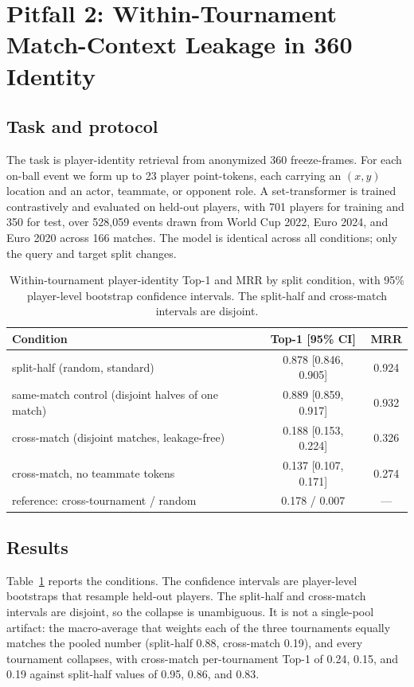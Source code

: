 \section{Pitfall 2: Within-Tournament Match-Context Leakage in 360 Identity}
\label{sec:p2}

\subsection{Task and protocol}
\label{sec:p2-task}

The task is player-identity retrieval from anonymized 360 freeze-frames. For
each on-ball event we form up to 23 player point-tokens, each carrying an
$(x, y)$ location and an actor, teammate, or opponent role. A set-transformer
is trained contrastively and evaluated on held-out players, with 701 players
for training and 350 for test, over 528{,}059 events drawn from World Cup 2022,
Euro 2024, and Euro 2020 across 166 matches. The model is identical across all
conditions; only the query and target split changes.

\begin{table}[t]
\centering
\caption{Within-tournament player-identity Top-1 and MRR by split condition,
with 95\% player-level bootstrap confidence intervals. The split-half and
cross-match intervals are disjoint.}
\label{tab:p2}
\begin{tabular}{lcc}
\toprule
Condition & Top-1 [95\% CI] & MRR \\
\midrule
split-half (random, standard) & 0.878 [0.846, 0.905] & 0.924 \\
same-match control (disjoint halves of one match) & 0.889 [0.859, 0.917] & 0.932 \\
cross-match (disjoint matches, leakage-free) & 0.188 [0.153, 0.224] & 0.326 \\
cross-match, no teammate tokens & 0.137 [0.107, 0.171] & 0.274 \\
reference: cross-tournament / random & 0.178 / 0.007 & --- \\
\bottomrule
\end{tabular}
\end{table}

\subsection{Results}
\label{sec:p2-results}

Table~\ref{tab:p2} reports the conditions. The confidence intervals are
player-level bootstraps that resample held-out players. The split-half and
cross-match intervals are disjoint, so the collapse is unambiguous. It is not a
single-pool artifact: the macro-average that weights each of the three
tournaments equally matches the pooled number (split-half 0.88, cross-match
0.19), and every tournament collapses, with cross-match per-tournament Top-1 of
0.24, 0.15, and 0.19 against split-half values of 0.95, 0.86, and 0.83.

